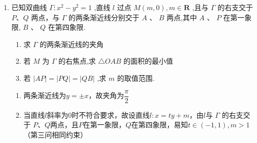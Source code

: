 \begin{enumerate}
\begin{jieda}
\begin{enumerate}
            所以双曲线 $C$ 的方程为 ${x}^{2} - \dfrac{{y}^{2}}{3} = 1$ .
            \item 
            设$P\left( {{x}_{1},{y}_{1}}\right)$ 、 $Q\left( {{x}_{2},{y}_{2}}\right)$，其中点为$N(x_0, y_0)$则$\left\{\begin{array}{l}
                 x_1^{2} - \dfrac{y_1^{2}}{3} = 1 \\
                 x_2^{2} - \dfrac{y_2^{2}}{3} = 1
            \end{array}\right.$
            两式做差可得$(x_1+x_2)(x_1-x_2) - \dfrac{(y_1+y_2)(y_1-y_2)}{3} = 0$，易知$k_{PQ}$存在，故$k_{PQ} = \dfrac{y_1-y_2}{x_1-x_2} = \dfrac{3(x_1+x_2)}{y_1+y_2} = \dfrac{3x_0}{y_0}$，故$PQ$为$y = \dfrac{3x_0}{y_0}(x-2)$，代入$N(x_0, y_0)$有$y_0^2= 3x_0^2-6x_0$
            
            $PQ$的垂直平分线为$y = -\dfrac{1}{k_{PQ}}(x-x_0)+y_0 = -\dfrac{y_0}{3x_0}(x-x_0)+y_0 = -\dfrac{y_0}{3x_0}x+\dfrac{4y_0}{3}$
        \end{enumerate}
    \end{jieda}

    \item 已知双曲线 $\Gamma  : {x}^{2} - {y}^{2} = 1$ ,直线 $l$ 过点 $M\left( {m,0}\right) ,m \in  \mathbf{R}$ ,且与 $\Gamma$ 的右支交于 $P\text{、}Q$ 两点，与 $\Gamma$ 的两条渐近线分别交于 $A$ 、 $B$ 两点,其中 $A$ 、 $P$ 在第一象限, $B$ 、 $Q$ 在第四象限.
    \begin{enumerate}
        \item 求 $\Gamma$ 的两条渐近线的夹角
        \item 若 $M$ 为 $\Gamma$ 的右焦点,求 $\bigtriangleup {OAB}$ 的面积的最小值
        \item 若 $\left| {AP}\right|  = \left| {PQ}\right|  = \left| {QB}\right|$ ,求 $m$ 的取值范围.
    \end{enumerate}
    \begin{jieda}
        \begin{enumerate}
            \item 两条渐近线为$y = \pm x$，故夹角为$\dfrac{\pi}{2}$
            \item 当直线$l$斜率为0时不符合要求，故设直线$l: x = ty+m$，由$l$与 $\Gamma$ 的右支交于 $P\text{、}Q$两点，且$P$在第一象限，$Q$在第四象限，易知$t \in (-1, 1), m > 1$（第三问相同约束）
            

\end{enumerate}
\end{jieda}
\end{enumerate}
